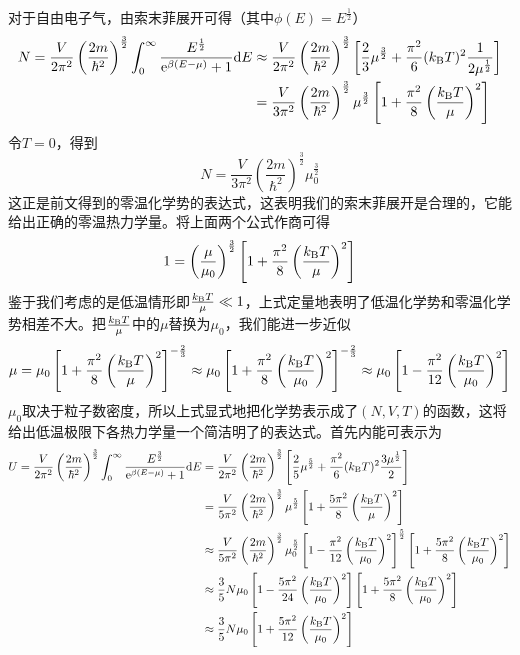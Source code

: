 \documentclass[../../main.tex]{subfiles}
\begin{document}
对于自由电子气，由索末菲展开可得（其中\(\phi(E)=E^{\frac{1}{2}}\)）
\begin{equation}
    \begin{split}
        N=\frac{V}{2\pi^2}\left(\frac{2m}{\hbar^2}\right)^{\frac{3}{2}}\int_0^{\infty}\frac{E^{\frac{1}{2}}}{\mathrm{e}^{\beta(E-\mu)}+1}\dd E&\approx \frac{V}{2\pi^2}\left(\frac{2m}{\hbar^2}\right)^{\frac{3}{2}}\left[\frac{2}{3}\mu^{\frac{3}{2}}+\frac{\pi^2}{6}(k_{\mathrm{B}} T)^2\frac{1}{2\mu^{\frac{1}{2}}}\right] \\
        &=\frac{V}{3\pi^2}\left(\frac{2m}{\hbar^2}\right)^{\frac{3}{2}}\mu^{\frac{3}{2}}\left[1+\frac{\pi^2}{8}\left(\frac{k_{\mathrm{B}} T}{\mu}\right)^2\right]
    \end{split}
\end{equation}
令\(T=0\)，得到
\begin{equation}
    N=\frac{V}{3\pi^2}\left(\frac{2m}{\hbar^2}\right)^{\frac{3}{2}}\mu_0^{\frac{3}{2}}
\end{equation}
这正是前文得到的零温化学势的表达式，这表明我们的索末菲展开是合理的，它能给出正确的零温热力学量。将上面两个公式作商可得
\begin{equation}
    1=\left(\frac{\mu}{\mu_0}\right)^{\frac{3}{2}}\left[1+\frac{\pi^2}{8}\left(\frac{k_{\mathrm{B}} T}{\mu}\right)^2\right]
\end{equation}
鉴于我们考虑的是低温情形即\(\frac{k_{\mathrm{B}} T}{\mu}\ll 1\)，上式定量地表明了低温化学势和零温化学势相差不大。把\(\frac{k_{\mathrm{B}} T}{\mu}\)中的\(\mu\)替换为\(\mu_0\)，我们能进一步近似
\begin{equation}
    \mu=\mu_0\left[1+\frac{\pi^2}{8}\left(\frac{k_{\mathrm{B}} T}{\mu}\right)^2\right]^{-\frac{2}{3}}\approx \mu_0\left[1+\frac{\pi^2}{8}\left(\frac{k_{\mathrm{B}} T}{\mu_0}\right)^2\right]^{-\frac{2}{3}}\approx \mu_0\left[1-\frac{\pi^2}{12}\left(\frac{k_{\mathrm{B}} T}{\mu_0}\right)^2\right]
\end{equation}
\(\mu_0\)取决于粒子数密度，所以上式显式地把化学势表示成了\((N,V,T)\)的函数，这将给出低温极限下各热力学量一个简洁明了的表达式。首先内能可表示为
\begin{equation}
    \begin{split}
        U=\frac{V}{2\pi^2}\left(\frac{2m}{\hbar^2}\right)^{\frac{3}{2}}\int_0^{\infty}\frac{E^{\frac{3}{2}}}{\mathrm{e}^{\beta(E-\mu)}+1}\dd E&=\frac{V}{2\pi^2}\left(\frac{2m}{\hbar^2}\right)^{\frac{3}{2}}\left[\frac{2}{5}\mu^{\frac{5}{2}}+\frac{\pi^2}{6}(k_{\mathrm{B}} T)^2\frac{3\mu^{\frac{1}{2}}}{2}\right] \\
        &=\frac{V}{5\pi^2}\left(\frac{2m}{\hbar^2}\right)^{\frac{3}{2}}\mu^{\frac{5}{2}}\left[1+\frac{5\pi^2}{8}\left(\frac{k_{\mathrm{B}} T}{\mu}\right)^2\right] \\
        & \approx\frac{V}{5\pi^2}\left(\frac{2m}{\hbar^2}\right)^{\frac{3}{2}}\mu_0^{\frac{5}{2}}\left[1-\frac{\pi^2}{12}\left(\frac{k_{\mathrm{B}} T}{\mu_0}\right)^2\right]^{\frac{5}{2}}\left[1+\frac{5\pi^2}{8}\left(\frac{k_{\mathrm{B}} T}{\mu_0}\right)^2\right] \\
        & \approx\frac{3}{5}N\mu_0\left[1-\frac{5\pi^2}{24}\left(\frac{k_{\mathrm{B}} T}{\mu_0}\right)^2\right]\left[1+\frac{5\pi^2}{8}\left(\frac{k_{\mathrm{B}} T}{\mu_0}\right)^2\right] \\
        & \approx \frac{3}{5}N\mu_0\left[1+\frac{5\pi^2}{12}\left(\frac{k_{\mathrm{B}} T}{\mu_0}\right)^2\right]
    \end{split}
\end{equation}
\end{document}

